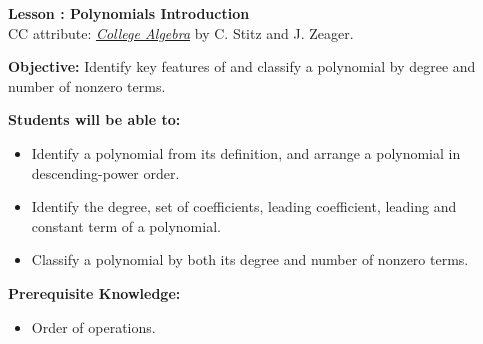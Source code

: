 \documentclass[12pt]{article}
\theoremstyle{definition}
\begin{document}
{\bf \large Lesson : Polynomials Introduction}\label{les:polynomials_introduction}
\\ CC attribute: \href{http://www.stitz-zeager.com}{\it{College Algebra}} by C. Stitz and J. Zeager. 
\hfill \doclicenseImage[imagewidth=5em]\\
\par
{\bf Objective:} Identify key features of and classify a polynomial by degree and number of nonzero terms.\\
\par
{\bf Students will be able to:}
\begin{itemize}
	\item Identify a polynomial from its definition, and arrange a polynomial in descending-power order.
	\item Identify the degree, set of coefficients, leading coefficient, leading and constant term of a polynomial.
	\item Classify a polynomial by both its degree and number of nonzero terms.
\end{itemize}
{\bf Prerequisite Knowledge:}
\begin{itemize}
	\item Order of operations.
\end{itemize}
\hrulefill
\end{document}
